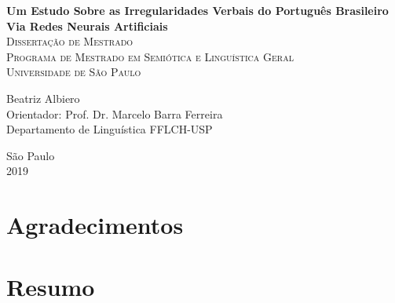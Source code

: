 \documentclass[12pt,twoside,a4paper]{book}
\begin{document}
\frontmatter 
\fancyhead[RO]{{\footnotesize\rightmark}\hspace{2em}\thepage}
\setcounter{tocdepth}{2}
\fancyhead[LE]{\thepage\hspace{2em}\footnotesize{\leftmark}}
\fancyhead[RE,LO]{}
\fancyhead[RO]{{\footnotesize\rightmark}\hspace{2em}\thepage}

\onehalfspacing  %

\thispagestyle{empty}
\begin{center}
    \vspace*{2.3cm}
    \textbf{\Large{Um Estudo Sobre as Irregularidades Verbais do Português Brasileiro Via Redes Neurais Artificiais
}}\\
    
    
    \vskip 2cm
    \textsc{
    Dissertação de Mestrado\\[+0.5cm]
    Programa de Mestrado em Semiótica e Linguística Geral\\[+0.5cm]
    Universidade de São Paulo\\[+0.5cm]
   }
    
    \vspace*{6.2cm}
    Beatriz Albiero\\
    Orientador: Prof. Dr. Marcelo Barra Ferreira\\
    Departamento de Linguística FFLCH-USP
    
    \vskip 0.5cm
    \normalsize{São Paulo\\ 2019}
\end{center}




\chapter*{Agradecimentos}


\chapter*{Resumo}
\end{document}
